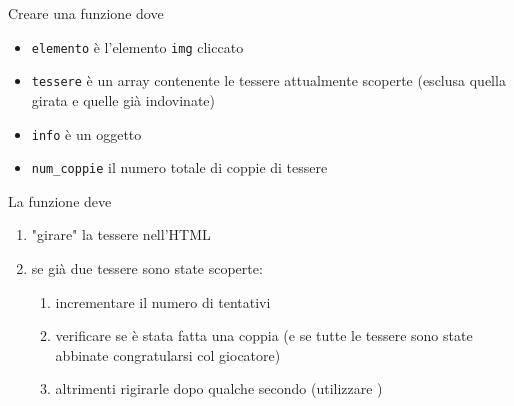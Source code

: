 \begin{frame}\transfade
  \begin{exercise}\centering
    Creare una funzione  dove
    \begin{itemize}
      \item \texttt{elemento} è l'elemento \texttt{img} cliccato
      \item \texttt{tessere} è un array contenente le tessere attualmente scoperte (esclusa quella girata e quelle già indovinate)
      \item \texttt{info} è un oggetto 
      \item \texttt{num\_coppie} il numero totale di coppie di tessere
    \end{itemize}
    La funzione deve
    \begin{enumerate}
      \item "girare" la tessere nell'HTML
      \item se già due tessere sono state scoperte:
        \begin{enumerate}
          \item incrementare il numero di tentativi
          \item verificare se è stata fatta una coppia (e se tutte le tessere sono state abbinate congratularsi col giocatore)
          \item altrimenti rigirarle dopo qualche secondo (utilizzare )
        \end{enumerate}
    \end{enumerate}
  \end{exercise}
\end{frame}


